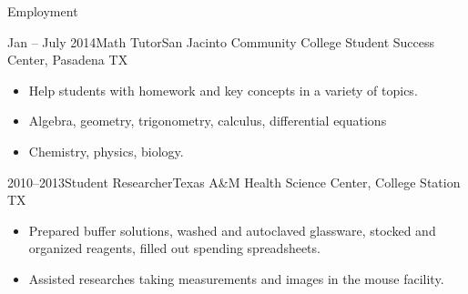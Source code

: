 \documentclass[]{mcdowellcv}
\begin{document}

	\begin{cvsection}{Employment}

		\begin{cvsubsection}{Jan -- July 2014}{Math Tutor}{San Jacinto Community College Student Success Center, Pasadena TX}
      \begin{itemize}
      \item Help students with homework and key concepts in a variety of topics.
      \item Algebra, geometry, trigonometry, calculus, differential equations
      \item Chemistry, physics, biology.
      \end{itemize}
    \end{cvsubsection}

		\begin{cvsubsection}{2010--2013}{Student Researcher}{Texas A\&M Health Science Center, College Station TX}
      \vspace*{2em} %
			\begin{itemize}
        \item Prepared buffer solutions, washed and autoclaved glassware,
          stocked and organized reagents, filled out spending spreadsheets.
        \item Assisted researches taking measurements and images in the mouse facility.
			\end{itemize}
		\end{cvsubsection}

	\end{cvsection}

\end{document}
